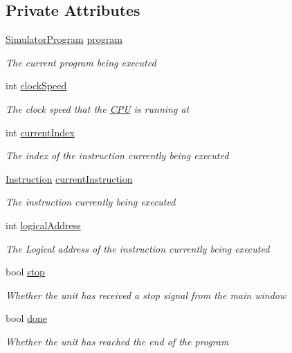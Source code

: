 \subsection*{Private Attributes}
\begin{DoxyCompactItemize}
\item 
\hyperlink{class_c_p_u___o_s___simulator_1_1_c_p_u_1_1_simulator_program}{Simulator\+Program} \hyperlink{class_c_p_u___o_s___simulator_1_1_c_p_u_1_1_execution_unit_a192670bee8ca089c38e9989350f658d6}{program}
\begin{DoxyCompactList}\small\item\em The current program being executed \end{DoxyCompactList}\item 
int \hyperlink{class_c_p_u___o_s___simulator_1_1_c_p_u_1_1_execution_unit_a0deb0a3e0c9fa402598bbf18be6535cc}{clock\+Speed}
\begin{DoxyCompactList}\small\item\em The clock speed that the \hyperlink{namespace_c_p_u___o_s___simulator_1_1_c_p_u}{C\+P\+U} is running at \end{DoxyCompactList}\item 
int \hyperlink{class_c_p_u___o_s___simulator_1_1_c_p_u_1_1_execution_unit_af6807cb5343acc2c40a08166c748f1f0}{current\+Index}
\begin{DoxyCompactList}\small\item\em The index of the instruction currently being executed \end{DoxyCompactList}\item 
\hyperlink{class_c_p_u___o_s___simulator_1_1_c_p_u_1_1_instruction}{Instruction} \hyperlink{class_c_p_u___o_s___simulator_1_1_c_p_u_1_1_execution_unit_a12fc8d1fd19eab177941b9f98675eb7f}{current\+Instruction}
\begin{DoxyCompactList}\small\item\em The instruction currently being executed \end{DoxyCompactList}\item 
int \hyperlink{class_c_p_u___o_s___simulator_1_1_c_p_u_1_1_execution_unit_aa387f2bbbf0de1c75cbd1c79e27a630c}{logical\+Address}
\begin{DoxyCompactList}\small\item\em The Logical address of the instruction currently being executed \end{DoxyCompactList}\item 
bool \hyperlink{class_c_p_u___o_s___simulator_1_1_c_p_u_1_1_execution_unit_aad508435c1085ec880b75723260b0439}{stop}
\begin{DoxyCompactList}\small\item\em Whether the unit has received a stop signal from the main window \end{DoxyCompactList}\item 
bool \hyperlink{class_c_p_u___o_s___simulator_1_1_c_p_u_1_1_execution_unit_aa62cb66691fd4d782a4fa5c70843da6e}{done}
\begin{DoxyCompactList}\small\item\em Whether the unit has reached the end of the program \end{DoxyCompactList}\end{DoxyCompactItemize}


